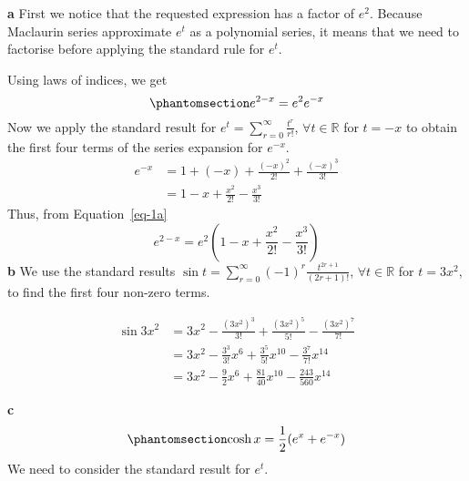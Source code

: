 \documentclass[
  a4paper,
]{report}
\begin{document}
\begin{tcolorbox}[enhanced jigsaw, title={Solution}, titlerule=0mm, colbacktitle=quarto-callout-tip-color!10!white, coltitle=black, toprule=.15mm, colframe=quarto-callout-tip-color-frame, breakable, bottomtitle=1mm, toptitle=1mm, arc=.35mm, rightrule=.15mm, bottomrule=.15mm, left=2mm, opacitybacktitle=0.6, leftrule=.75mm, opacityback=0, colback=white]

\textbf{a} First we notice that the requested expression has a factor of
\(e^2\). Because Maclaurin series approximate \(e^t\) as a polynomial
series, it means that we need to factorise before applying the standard
rule for \(e^t\).

Using laws of indices, we get
\begin{equation}\phantomsection\label{eq-4a}{e^{2-x}=e^2e^{-x}}\end{equation}
Now we apply the standard result for
\(e^t=\sum_{r=0}^\infty\frac{t^r}{r!}\), \(\forall t\in \mathbb{R}\) for
\(t=-x\) to obtain the first four terms of the series expansion for
\(e^{-x}\). \begin{equation*}
\begin{split}
e^{-x}&=1+(-x)+\frac{(-x)^2}{2!}+\frac{(-x)^3}{3!} \\
&=1-x+\frac{x^2}{2!}-\frac{x^3}{3!}
\end{split}
\end{equation*} Thus, from Equation~\ref{eq-1a}
\[e^{2-x}=e^2\left(1-x+\frac{x^2}{2!}-\frac{x^3}{3!}\right)\] \textbf{b}
We use the standard results
\(\sin t = \sum_{r=0}^\infty (-1)^r \frac{t^{2r+1}}{(2r+1)!}\),
\(\forall t \in \mathbb{R}\) for \(t=3x^2\), to find the first four
non-zero terms.

\begin{equation*}
\begin{split}
\sin 3x^2 &= 3x^2 - \frac{(3x^2)^3}{3!}+ \frac{(3x^2)^5}{5!}-\frac{(3x^2)^7}{7!} \\
&=3x^2 -\frac{3^3}{3!}x^6+\frac{3^5}{5!}x^{10}-\frac{3^7}{7!}x^{14} \\
&=3x^2 -\frac{9}{2}x^6+\frac{81}{40}x^{10}-\frac{243}{560}x^{14}
\end{split}
\end{equation*}

\textbf{c}\\
\begin{equation}\phantomsection\label{eq-4b}{\cosh x = \frac{1}{2}(e^x+e^{-x})}\end{equation}
We need to consider the standard result for \(e^t\).


\end{tcolorbox}
\end{document}

